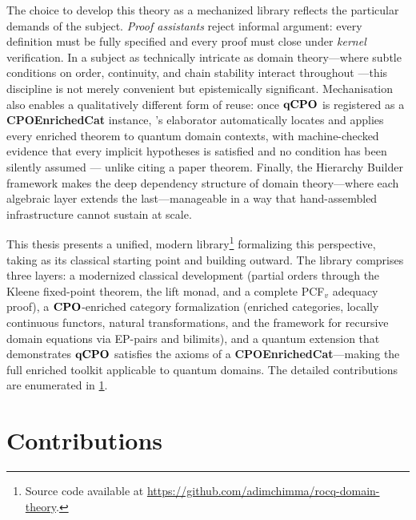 The choice to develop this theory as a mechanized library reflects the particular demands of the subject. \emph{Proof assistants} reject
informal argument: every definition must be fully specified and every proof must close under \emph{kernel} verification. In a subject 
as technically intricate as domain theory---where subtle conditions on order, continuity, and chain stability interact throughout
---this discipline is not merely convenient but epistemically significant. Mechanisation also enables a qualitatively different form 
of reuse: once $\mathbf{qCPO}$ is registered as a \textbf{CPOEnrichedCat} instance, \Rocq{}'s elaborator automatically locates and applies every
enriched theorem to quantum domain contexts, with machine-checked evidence that every implicit hypotheses is satisfied and no condition
has been silently assumed --- unlike citing a paper theorem. Finally, the Hierarchy Builder framework makes the deep dependency structure 
of domain theory---where each algebraic layer extends the last---manageable in a way that hand-assembled infrastructure cannot sustain 
at scale.

This thesis presents a unified, modern \Rocq{} library\footnote{Source code available at \url{https://github.com/adimchimma/rocq-domain-theory}.} formalizing this perspective, taking \cite{BKV2009} as its classical 
starting point and building outward. The library comprises three layers: a modernized classical development (partial orders through the 
Kleene fixed-point theorem, the lift monad, and a complete PCF$_v$ adequacy proof), a $\mathbf{CPO}$-enriched category formalization 
(enriched categories, locally continuous functors, natural transformations, and the framework for recursive domain equations via 
EP-pairs and bilimits), and a quantum extension that demonstrates $\mathbf{qCPO}$ satisfies the axioms of a 
\textbf{CPOEnrichedCat}---making the full enriched toolkit applicable to quantum domains. The detailed contributions are enumerated in 
\cref{sec:intro-contributions}.



\section{Contributions}
\label{sec:intro-contributions}

